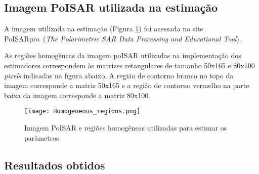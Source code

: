 \subsection{Imagem PoISAR utilizada na estimação}

A imagem utilizada na estimação (Figura \ref{img_1}) foi acessada no site PoISARpro~\citet{PoISARpro}(\textit{The Polarimetric SAR Data Processing and Educational Tool}). 

As regiões homogêneas da imagem poISAR utilizadas na implementação dos estimadores correspondem às matrizes retangulares de tamanho 50x165 e 80x100 \textit{pixels} indicadas na figura abaixo. A região de contorno branco no topo da imagem corresponde a matriz 50x165 e a região de contorno vermelho na parte baixa da imagem corresponde a matriz 80x100.
\begin{figure}[H]
     \centering
     \texttt{[image: Homogeneous\_regions.png]}
     \caption{Imagem PoISAR e regiões homogêneas utilizadas para estimar os parâmetros}
     \label{img_1}
\end{figure}

\subsection{Resultados obtidos}

